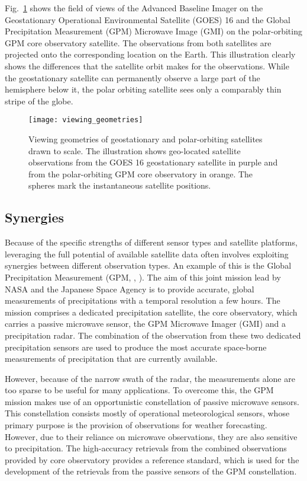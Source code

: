 Fig.~\ref{fig:remote_sensing:viewing_geometries} shows the field of views of the
Advanced Baseline Imager on the Geostationary Operational Environmental
Satellite (GOES) 16 and the Global Precipitation Measurement (GPM) Microwave
Image (GMI) on the polar-orbiting GPM core observatory satellite. The
observations from both satellites are projected onto the corresponding location
on the Earth. This illustration clearly shows the differences that the satellite
orbit makes for the observations. While the geostationary satellite can
permanently observe a large part of the hemisphere below it, the polar orbiting
satellite sees only a comparably thin stripe of the globe.

\begin{figure}[!hbpt]
  \centering
  \texttt{[image: viewing\_geometries]}
  \caption{Viewing geometries of geostationary and polar-orbiting satellites
  drawn to scale. The illustration shows geo-located satellite observations from
  the GOES 16 geostationary satellite in purple and from the polar-orbiting GPM
  core observatory in orange. The spheres mark the instantaneous satellite
  positions.}
  \label{fig:remote_sensing:viewing_geometries}
\end{figure}

\subsection{Synergies}
\label{sec:radiative_transfer:synergies}

Because of the specific strengths of different sensor types and satellite
platforms, leveraging the full potential of available satellite data often
involves exploiting synergies between different observation types. An example of
this is the Global Precipitation Measurement (GPM, \citeauthor{hou14},
\citeyear{hou14}). The aim of this joint mission lead by NASA and the Japanese Space
Agency is to provide accurate, global measurements of precipitations with a
temporal resolution a few hours. The mission comprises a dedicated precipitation
satellite, the core observatory, which carries a passive microwave sensor, the
GPM Microwave Imager (GMI) and a precipitation radar. The combination of the
observation from these two dedicated precipitation sensors are used to produce the
most accurate space-borne measurements of precipitation that are currently
available.

However, because of the narrow swath of the radar, the measurements alone are
too sparse to be useful for many applications. To overcome this, the GPM mission
makes use of an opportunistic constellation of passive microwave sensors. This
constellation consists mostly of operational meteorological sensors, whose
primary purpose is the provision of observations for weather forecasting.
However, due to their reliance on microwave observations, they are also
sensitive to precipitation. The high-accuracy retrievals from the combined
observations provided by core observatory provides a reference standard, which
is used for the development of the retrievals from the passive sensors of the
GPM constellation.


